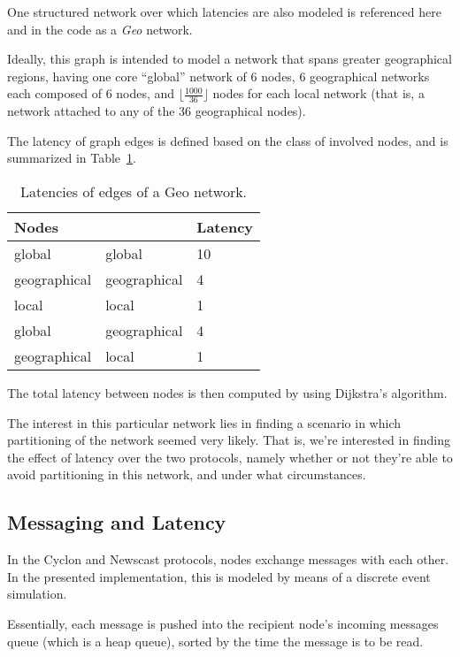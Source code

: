 \documentclass[a4paper]{ifacconf}
\begin{document}
One structured network over which latencies are also modeled is referenced here and in the code as a \emph{Geo} network.

Ideally, this graph is intended to model a network that spans greater geographical regions, having one core ``global'' network of 6 nodes, 6 geographical networks each composed of 6 nodes, and $\lfloor\frac{1000}{36}\rfloor$ nodes for each local network (that is, a network attached to any of the 36 geographical nodes).

The latency of graph edges is defined based on the class of involved nodes, and is summarized in Table~\ref{tab:latency}.

\begin{table}
    \centering\begin{tabular}{lll}
        Nodes & & Latency \\
        \hline
        global & global & 10 \\
        geographical & geographical & 4 \\
        local & local & 1 \\
        global & geographical & 4 \\
        geographical & local & 1 \\
    \end{tabular}
    \caption{Latencies of edges of a Geo network.}
    \label{tab:latency}
\end{table}

The total latency between nodes is then computed by using Dijkstra's algorithm.

The interest in this particular network lies in finding a scenario in which partitioning of the network seemed very likely.
That is, we're interested in finding the effect of latency over the two protocols, namely whether or not they're able to avoid partitioning in this network, and under what circumstances.

\subsection{Messaging and Latency}\label{sec:messaging}

In the Cyclon and Newscast protocols, nodes exchange messages with each other.
In the presented implementation, this is modeled by means of a discrete event simulation.

Essentially, each message is pushed into the recipient node's incoming messages queue (which is a heap queue), sorted by the time the message is to be read.
\end{document}
